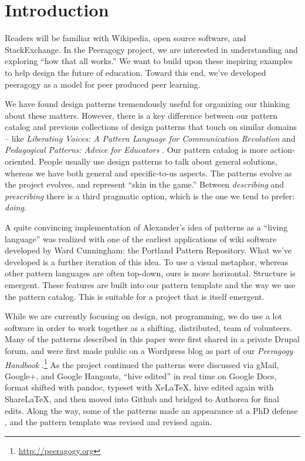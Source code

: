 \section{Introduction}

Readers will be familiar with Wikipedia, open source software, and StackExchange.  In the Peeragogy project, we are interested in understanding and exploring ``how that all works.''    We want to build upon these inspiring examples to help design the future of education.  Toward this end, we've developed peeragogy as a model for peer produced peer learning.

We have found design patterns tremendously useful for organizing our thinking about these matters.  However, there is a key difference between our pattern catalog and previous collections of design patterns that touch on similar domains -- like \emph{Liberating Voices: A Pattern Language for Communication Revolution} \cite{schuler2008liberating} and \emph{Pedagogical Patterns: Advice for Educators} \cite{bergin2012pedagogical}.  Our pattern catalog is more action-oriented.  People usually use design patterns to talk about general solutions, whereas we have both general and specific-to-us aspects. The patterns evolve as the project evolves, and represent ``skin in the game.''   Between \emph{describing} and \emph{prescribing} there is a third pragmatic option, which is the one we tend to prefer: \emph{doing}.  

A quite convincing implementation of Alexander’s idea of patterns as a ``living language'' \cite[p.~xvii]{alexander1977pattern} was realized with one of the earliest applications of wiki software developed by Ward Cunningham: the Portland Pattern Repository. What we've developed is a further iteration of this idea. To use a visual metaphor, whereas other pattern languages are often top-down, ours is more horizontal.  Structure is emergent.  These features are built into our pattern template and the way we use the pattern catalog.  This is suitable for a project that is itself emergent.

While we are currently focusing on design, not programming, we do use a lot software in order to work together as a shifting, distributed, team of volunteers.  Many of the patterns described in this paper were first shared in a private Drupal forum, and were first made public on a Wordpress blog as part of our \emph{Peeragogy Handbook} \cite{peeragogy-handbook}.\footnote{\url{http://peeragogy.org}}  As the project continued the patterns were discussed via gMail, Google+, and Google Hangouts, ``hive edited'' in real time on Google Docs, format shifted with pandoc, typeset with XeLaTeX, hive edited again with ShareLaTeX, and then moved into Github and bridged to Authorea for final edits.  Along the way, some of the patterns made an appearance at a PhD defense \cite{corneli-thesis}, and the pattern template was revised and revised again.  

